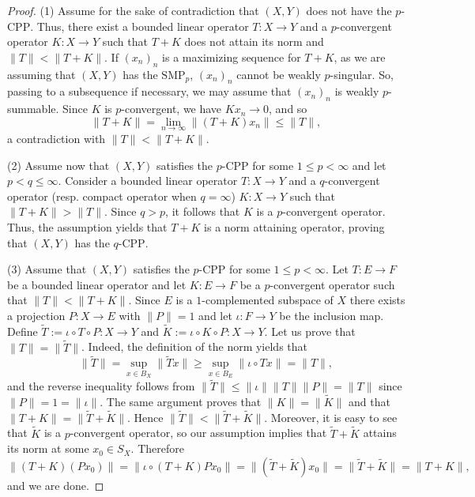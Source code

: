 \documentclass[12 pt]{article}%
\newtheorem{final remark}[theorem]{Final Remark}
\newcommand{\norma}[1]{\| #1 \|}
\begin{document}
\begin{proof} (1) Assume for the sake of contradiction that $(X, Y)$ does not have the $p$-$\mathrm{CPP}$. Thus, there exist a bounded linear operator $T: X \to Y$ and a $p$-convergent operator $K : X \to Y$ such that $T+K$ does not attain its norm and $\norma{T} < \norma{T+K}$. If $(x_n)_n$ is a maximizing sequence for $T+K$, as we are assuming that $(X, Y)$ has the $\mathrm{SMP}_p$, $(x_n)_n$ cannot be weakly $p$-singular. So, passing to a subsequence if necessary, we may assume that $(x_n)_n$ is weakly $p$-summable. Since $K$ is $p$-convergent, we have $Kx_n \to 0$, and so
$$ \norma{T+K} = \lim_{n \to \infty} \norma{(T+K)x_n} \leq \norma{T}, $$
a contradiction with $\norma{T} < \norma{T+K}$.

(2) Assume now that $(X, Y)$ satisfies the $p$-$\mathrm{CPP}$ for some $1 \leq p < \infty$ and let  $p < q \leq \infty$. Consider a bounded linear operator $T: X \to Y$ and a $q$-convergent operator (resp. compact operator when $q=\infty$) $K : X \to Y$ such that $\norma{T+K} > \norma{T}$. Since $q > p$, it follows that $K$ is a $p$-convergent operator. Thus, the assumption yields that $T+K$ is a norm attaining operator, proving that $(X, Y)$ has the $q$-$\mathrm{CPP}$. 

(3) Assume that $(X,Y)$ satisfies the $p$-CPP for some $1\leq  p<\infty $. Let $T: E \to F$ be a bounded linear operator and let $K:E \to F$ be a $p$-convergent operator such that $\norma{T}< \norma{T+K}$. Since $E$ is a $1$-complemented subspace of $X$ there exists a projection $P: X \to E$ with $\norma{P}=1$ and let $\iota: F \to Y$ be the inclusion map. Define $\widetilde{T} := \iota \circ T \circ P: X \to Y$ and $\widetilde{K}:= \iota \circ K \circ P : X \to Y$. Let us prove that 
$\norma{T}= \norma{\widetilde{T}}$. Indeed, the definition of the norm yields that
$$\norma{\widetilde{T}}= \sup_{x \in B_{X}}\norma{\widetilde{T}x}\geq \sup_{x \in B_{E}} \norma{\iota \circ T x}= \norma{T}, $$
and the reverse inequality follows from 
$\norma{\widetilde{T}}\leq \norma{\iota}\norma{T} \norma{P}= \norma{T}$ since $\norma{P} = 1 = \norma{\iota}$. The same argument proves that  $\norma{K}= \norma{\widetilde{K}}$ and that $\norma{T+K} = \norma{\widetilde{T} + \widetilde{K}}$. Hence
$\norma{\widetilde{T}}< \norma{\widetilde{T}+ \widetilde{K}}$. Moreover, it is easy to see that $\widetilde{K}$ is a $p$-convergent operator, so our assumption implies that $\widetilde{T}+ \widetilde{K}$ attains its norm at some $x_{0} \in S_{X}$. Therefore
$$\norma{(T+K)(Px_{0})}=\norma{\iota \circ (T+K)Px_{0}}= \norma{(\widetilde{T}+ \widetilde{K})x_{0}}=\norma{\widetilde{T}+ \widetilde{K}}= \norma{T+K},$$
and we are done.
\end{proof}
\end{document}
